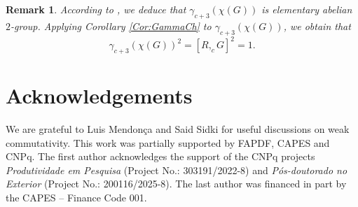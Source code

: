 \documentclass[12pt,leqno]{amsart}
\newtheorem{remar}[theorem]{\sc Remark}
\begin{document}
\begin{remar}
According to \cite[Theorem 3.3]{GRS}, we deduce that $\gamma_{c+3}(\chi(G))$ is elementary abelian $2$-group. Applying Corollary \ref{Cor:GammaCh} to $\gamma_{c+3}(\chi(G))$, we obtain that \[\gamma_{c+3}(\chi(G))^2= [R,_c G]^2=1.\]   
\end{remar}

\section*{Acknowledgements}

We are grateful to Luis Mendon\c ca and Said Sidki for useful discussions on weak commutativity. This work was partially supported by FAPDF, CAPES and CNPq. The first author acknowledges the support of the CNPq projects \textit{Produtividade em Pesquisa} (Project No.: 303191/2022-8) and \textit{P\'os-doutorado no Exterior} (Project No.: 200116/2025-8). The last author was financed in part by the CAPES -- Finance Code 001. 
\end{document}
